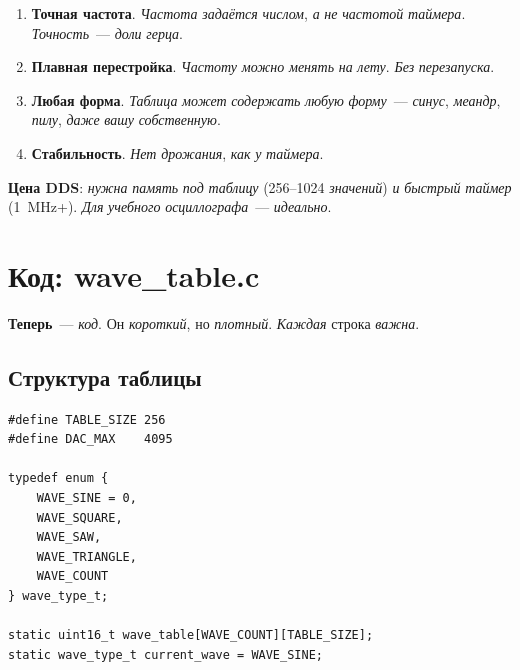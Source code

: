 \begin{enumerate}
    \item \textbf{Точная частота}. \emph{Частота}
          \emph{задаётся} \emph{числом}, \emph{а} \emph{не}
          \emph{частотой} \emph{таймера}. \emph{Точность}~---
          \emph{доли} \emph{герца}.
    \item \textbf{Плавная перестройка}. \emph{Частоту}
          \emph{можно} \emph{менять} \emph{на} \emph{лету}.
          \emph{Без} \emph{перезапуска}.
    \item \textbf{Любая форма}. \emph{Таблица} \emph{может}
          \emph{содержать} \emph{любую} \emph{форму}~---
          \emph{синус}, \emph{меандр}, \emph{пилу}, \emph{даже}
          \emph{вашу} \emph{собственную}.
    \item \textbf{Стабильность}. \emph{Нет} \emph{дрожания},
          \emph{как} \emph{у} \emph{таймера}.
\end{enumerate}

\begin{keybox}
\textbf{Цена DDS}: \emph{нужна} \emph{память} \emph{под}
\emph{таблицу} (\num{256}--\num{1024} \emph{значений})
\emph{и} \emph{быстрый} \emph{таймер} (\SI{1}{\mega\hertz}+).
\emph{Для} \emph{учебного} \emph{осциллографа}~--- \emph{идеально}.
\end{keybox}





\section{Код: wave\_table.c}
\label{sec:dds-code}

\textbf{Теперь}~--- \emph{код}. Он \emph{короткий}, но
\emph{плотный}. \emph{Каждая} строка \emph{важна}.

\subsection{Структура таблицы}

\begin{listing}[htbp]
\begin{verbatim}
#define TABLE_SIZE 256
#define DAC_MAX    4095

typedef enum {
    WAVE_SINE = 0,
    WAVE_SQUARE,
    WAVE_SAW,
    WAVE_TRIANGLE,
    WAVE_COUNT
} wave_type_t;

static uint16_t wave_table[WAVE_COUNT][TABLE_SIZE];
static wave_type_t current_wave = WAVE_SINE;
\end{verbatim}
\caption{Структура таблиц форм}
\label{lst:dds-table-struct}
\end{listing}

